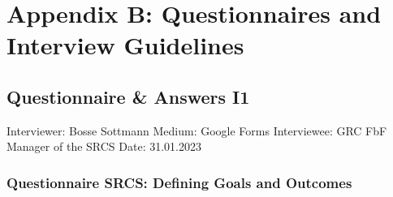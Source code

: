 
\chapter{Appendix B: Questionnaires and Interview Guidelines} %

\label{AppendixB} %


\section{Questionnaire \& Answers I1}

Interviewer: Bosse Sottmann\newline
Medium: Google Forms\newline
Interviewee: GRC FbF Manager of the SRCS \newline
Date: 31.01.2023\newline

\subsection*{Questionnaire SRCS: Defining Goals and Outcomes}

